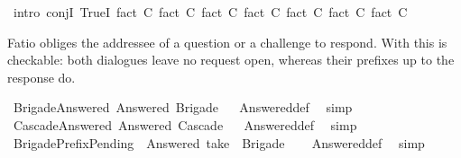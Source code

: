 \begin{isabellebody}
\ {\isacharparenleft}{\kern0pt}intro\ conjI\ TrueI{\isacharparenright}{\kern0pt}\ {\isacharparenleft}{\kern0pt}fact\ C{}{\isacharcomma}{\kern0pt}\ fact\ C{}{\isacharcomma}{\kern0pt}\ fact\ C{}{\isacharcomma}{\kern0pt}\ fact\ C{}{\isacharcomma}{\kern0pt}\ fact\ C{}{\isacharcomma}{\kern0pt}\ fact\ C{}{\isacharcomma}{\kern0pt}\ fact\ C{}{\isacharparenright}{\kern0pt}%
\endisatagproof
{\isafoldproof}%
%
\isadelimproof
%
\endisadelimproof
%
\isadelimdocument
%
\endisadelimdocument
%
\isatagdocument
%
\isamarkuptrue%
%
\endisatagdocument
{\isafolddocument}%
%
\isadelimdocument
%
\endisadelimdocument
%
\begin{isamarkuptext}%
Fatio obliges the addressee of a question or a challenge to respond. With
 this is checkable: both dialogues leave no request open, whereas their
prefixes up to the response do.%
\end{isamarkuptext}\isamarkuptrue%
\isamarkupfalse%
\ BrigadeAnswered{\isacharcolon}{\kern0pt}\ {\isachardoublequoteopen}Answered\ Brigade{\isachardoublequoteclose}%
\isadelimproof
\ %
\endisadelimproof
%
\isatagproof
{}\isamarkupfalse%
\ Answered{\isacharunderscore}{\kern0pt}def\ \isamarkupfalse%
\ simp%
\endisatagproof
{\isafoldproof}%
%
\isadelimproof
%
\endisadelimproof
\isanewline
{}\isamarkupfalse%
\ CascadeAnswered{\isacharcolon}{\kern0pt}\ {\isachardoublequoteopen}Answered\ Cascade{\isachardoublequoteclose}%
\isadelimproof
\ %
\endisadelimproof
%
\isatagproof
{}\isamarkupfalse%
\ Answered{\isacharunderscore}{\kern0pt}def\ \isamarkupfalse%
\ simp%
\endisatagproof
{\isafoldproof}%
%
\isadelimproof
%
\endisadelimproof
\isanewline
{}\isamarkupfalse%
\ BrigadePrefixPending{\isacharcolon}{\kern0pt}\ {\isachardoublequoteopen}{\isasymnot}\ Answered\ {\isacharparenleft}{\kern0pt}take\ {}\ Brigade{\isacharparenright}{\kern0pt}{\isachardoublequoteclose}\isanewline
%
\isadelimproof
\ \ %
\endisadelimproof
%
\isatagproof
{}\isamarkupfalse%
\ Answered{\isacharunderscore}{\kern0pt}def\ \isamarkupfalse%
\ simp%
\endisatagproof
{\isafoldproof}%
%
\isadelimproof
%
\endisadelimproof
%
\isadelimdocument
%
\endisadelimdocument
%
\isatagdocument
%
\isamarkuptrue%

\end{isabellebody}
